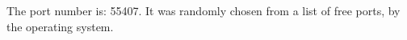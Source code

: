 The port number is: 55407. It was randomly chosen from a list of free ports, by the operating system.
